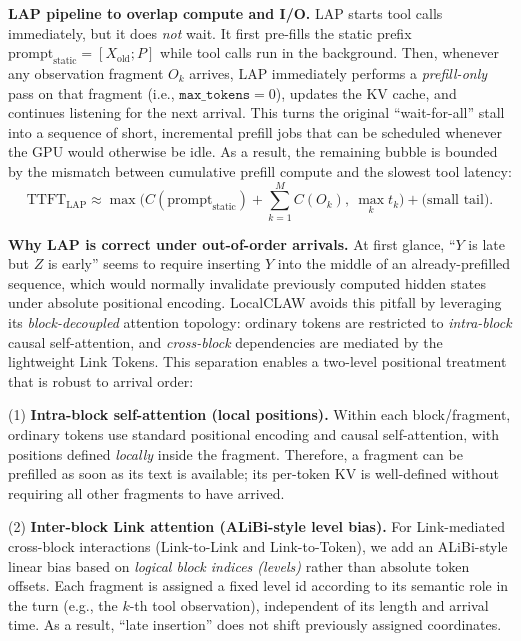 \textbf{LAP pipeline to overlap compute and I/O.}
LAP starts tool calls immediately, but it does \emph{not} wait.
It first pre-fills the static prefix $\text{prompt}_{\text{static}}=[X_{\text{old}}; P]$ while tool calls run in the background.
Then, whenever any observation fragment $O_k$ arrives, LAP immediately performs a \emph{prefill-only} pass on that fragment (i.e., $\texttt{max\_tokens}=0$), updates the KV cache, and continues listening for the next arrival.
This turns the original ``wait-for-all'' stall into a sequence of short, incremental prefill jobs that can be scheduled whenever the GPU would otherwise be idle.
As a result, the remaining bubble is bounded by the mismatch between cumulative prefill compute and the slowest tool latency:
$$\text{TTFT}_{\text{LAP}} \approx \max\Big(C(\text{prompt}_{\text{static}})+\sum_{k=1}^{M}C(O_k),\ \max_k t_k\Big) + \text{(small tail)}.$$

\textbf{Why LAP is correct under out-of-order arrivals.}
At first glance, ``$Y$ is late but $Z$ is early'' seems to require inserting $Y$ into the middle of an already-prefilled sequence, which would normally invalidate previously computed hidden states under absolute positional encoding.
LocalCLAW avoids this pitfall by leveraging its \emph{block-decoupled} attention topology: ordinary tokens are restricted to \emph{intra-block} causal self-attention, and \emph{cross-block} dependencies are mediated by the lightweight Link Tokens.
This separation enables a two-level positional treatment that is robust to arrival order:

(1) \textbf{Intra-block self-attention (local positions).}
Within each block/fragment, ordinary tokens use standard positional encoding and causal self-attention, with positions defined \emph{locally} inside the fragment.
Therefore, a fragment can be prefilled as soon as its text is available; its per-token KV is well-defined without requiring all other fragments to have arrived.

(2) \textbf{Inter-block Link attention (ALiBi-style level bias).}
For Link-mediated cross-block interactions (Link-to-Link and Link-to-Token), we add an ALiBi-style linear bias based on \emph{logical block indices (levels)} rather than absolute token offsets.
Each fragment is assigned a fixed level id according to its semantic role in the turn (e.g., the $k$-th tool observation), independent of its length and arrival time.
As a result, ``late insertion'' does not shift previously assigned coordinates.

